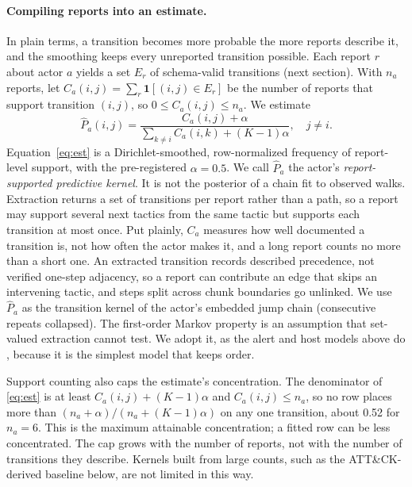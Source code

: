 \documentclass[letterpaper]{article} %
\begin{document}
\paragraph{Compiling reports into an estimate.} In plain terms, a transition becomes more probable the more reports describe it, and the smoothing keeps every unreported transition possible. Each report $r$ about actor $a$ yields a set $E_r$ of schema-valid transitions (next section). With $n_a$ reports, let $C_a(i,j)=\sum_r \mathbf{1}[(i,j)\in E_r]$ be the number of reports that support transition $(i,j)$, so $0\le C_a(i,j)\le n_a$. We estimate
\begin{equation}
\hat P_a(i,j)=\frac{C_a(i,j)+\alpha}{\sum_{k\neq i}C_a(i,k)+(K-1)\alpha},\quad j\neq i.
\label{eq:est}
\end{equation}
Equation~\eqref{eq:est} is a Dirichlet-smoothed, row-normalized frequency of report-level support, with the pre-registered $\alpha = 0.5$. We call $\hat{P}_a$ the actor's \emph{report-supported predictive kernel}. It is not the posterior of a chain fit to observed walks. Extraction returns a set of transitions per report rather than a path, so a report may support several next tactics from the same tactic but supports each transition at most once. Put plainly, $C_a$ measures how well documented a transition is, not how often the actor makes it, and a long report counts no more than a short one. An extracted transition records described precedence, not verified one-step adjacency, so a report can contribute an edge that skips an intervening tactic, and steps split across chunk boundaries go unlinked. We use $\hat{P}_a$ as the transition kernel of the actor's embedded jump chain (consecutive repeats collapsed). The first-order Markov property is an assumption that set-valued extraction cannot test. We adopt it, as the alert and host models above do \citep{ourston2003hmm,moody2026drift}, because it is the simplest model that keeps order. %

Support counting also caps the estimate's concentration. The denominator of \eqref{eq:est} is at least $C_a(i,j)+(K-1)\alpha$ and $C_a(i,j)\le n_a$, so no row places more than $(n_a+\alpha)/(n_a+(K-1)\alpha)$ on any one transition, about 0.52 for $n_a=6$. This is the maximum attainable concentration; a fitted row can be less concentrated. The cap grows with the number of reports, not with the number of transitions they describe. Kernels built from large counts, such as the ATT\&CK-derived baseline below, are not limited in this way.
\end{document}
